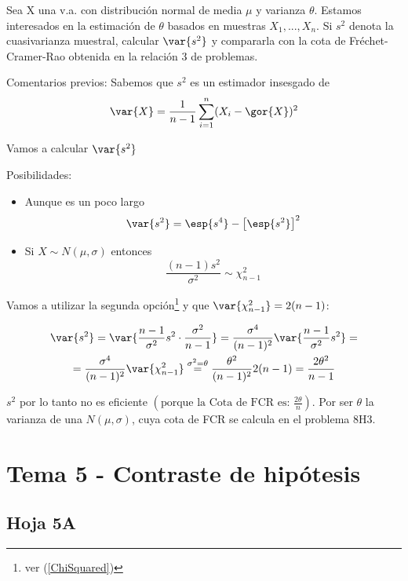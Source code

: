 \begin{problem}[9]
Sea X una v.a. con distribución normal de media $\mu$ y varianza $\theta$. Estamos interesados en la estimación de $\theta$ basados en muestras $X_1,...,X_n$. Si $s^2$ denota la cuasivarianza muestral, calcular $\var{s^2}$ y compararla con la cota de Fréchet-Cramer-Rao obtenida en la relación 3 de problemas.
\solution

Comentarios previos: Sabemos que $s^2$ es un estimador insesgado de
\[ \var{X} = \frac{1}{n - 1} \sum_{i=1}^n (X_i - \gor{X})^2 \]

Vamos a calcular $\var{s^2}$

Posibilidades:
\begin{itemize}
\item Aunque es un poco largo
\[
\var{s^2} = \esp{s^4} - \left[\esp{s^2}\right]^2
\]

\pagebreak

\item Si $X \sim N(\mu,\sigma)$ entonces \[\frac{(n-1)s^2}{\sigma^2} \sim \chi_{n-1}^2 \]
\end{itemize}

Vamos a utilizar la segunda opción\footnote{ver (\ref{ChiSquared})} y que $\var{\chi^2_{n - 1}} = 2 (n - 1)$:

\begin{gather*}
\var{s^2} =
\var{\frac{n-1}{\sigma^2}s^2\cdot\frac{\sigma^2}{n-1}} =
\frac{\sigma^4}{(n-1)^2} \var{\frac{n-1}{\sigma^2}s^2} =\\
= \frac{\sigma^4}{(n-1)^2} \var{\chi^2_{n-1}} \stackrel{\sigma^2 = \theta}{=}
\frac{\theta^2}{(n-1)^2}2(n-1) =
\frac{2\theta^2}{n-1}
\end{gather*}

$s^2$ por lo tanto no es eficiente $\left( \text{porque la Cota de FCR es: } \displaystyle\frac{2\theta}{n}\right)$.
Por ser $\theta$ la varianza de una $N(\mu,\sigma)$, cuya cota de FCR se calcula en el problema 8H3.

\end{problem}

\newpage
\section{Tema 5 - Contraste de hipótesis}
\subsection{Hoja 5A}

